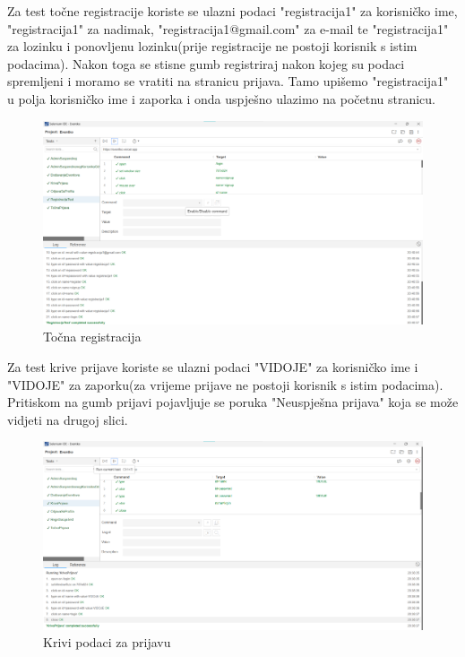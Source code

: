 		 	\indent Za test točne registracije koriste se ulazni podaci "registracija1" za korisničko ime, "registracija1" za nadimak, "registracija1@gmail.com" za e-mail te "registracija1" za lozinku i ponovljenu lozinku(prije registracije ne postoji korisnik s istim podacima). Nakon toga se stisne gumb registriraj nakon kojeg su podaci spremljeni i moramo se vratiti na stranicu prijava. Tamo upišemo "registracija1" u polja korisničko ime i zaporka i onda uspješno ulazimo na početnu stranicu.
		 	\begin{figure}[H]
		 		\includegraphics[width=\textwidth]{Slike/RegistracijaTest.png}
		 		\caption{Točna registracija}
		 	\end{figure}
	 	
	 		\indent Za test krive prijave koriste se ulazni podaci "VIDOJE" za korisničko ime i "VIDOJE" za zaporku(za vrijeme prijave ne postoji korisnik s istim podacima). Pritiskom na gumb prijavi pojavljuje se poruka "Neuspješna prijava" koja se može vidjeti na drugoj slici.
	 		
	 		\begin{figure}[H]
	 			\includegraphics[width=\textwidth]{Slike/KrivaPrijava.png}
	 			\caption{Krivi podaci za prijavu}
	 		\end{figure}
 		
